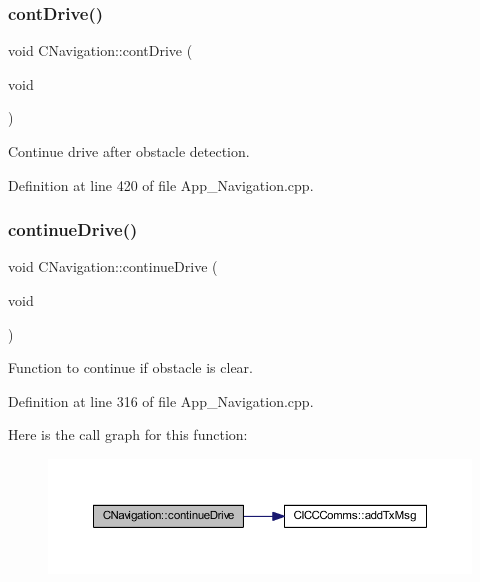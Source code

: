 \subsubsection{\texorpdfstring{contDrive()}{contDrive()}}
{\footnotesize\ttfamily void C\+Navigation\+::cont\+Drive (\begin{DoxyParamCaption}\item[{void}]{ }\end{DoxyParamCaption})\hspace{0.3cm}{\ttfamily [virtual]}}



Continue drive after obstacle detection. 



Definition at line 420 of file App\+\_\+\+Navigation.\+cpp.

\mbox{\label{class_c_navigation_ab3d29f3ab4a8a922f5af439f6d78aded}} 
\subsubsection{\texorpdfstring{continueDrive()}{continueDrive()}}
{\footnotesize\ttfamily void C\+Navigation\+::continue\+Drive (\begin{DoxyParamCaption}\item[{void}]{ }\end{DoxyParamCaption})\hspace{0.3cm}{\ttfamily [virtual]}}



Function to continue if obstacle is clear. 



Definition at line 316 of file App\+\_\+\+Navigation.\+cpp.

Here is the call graph for this function\+:\nopagebreak
\begin{figure}[H]
\begin{center}
\leavevmode
\includegraphics[width=350pt]{class_c_navigation_ab3d29f3ab4a8a922f5af439f6d78aded_cgraph}
\end{center}
\end{figure}
\mbox{\label{class_c_navigation_a42982842952ac5340b54f43a661673f4}} 
